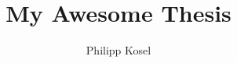 



\title{My Awesome Thesis}
\author{Philipp Kosel}

\maketitle
\newpage

\breakpointone

\lipsum[1]
\newpage

\lipsum[1]
\newpage

\tableofcontents
\newpage

\listoffigures
\newpage

\listoftables
\newpage

\printnomenclature
\newpage

\breakpointtwo







\newpage

\breakpointthree

\printbibliography


